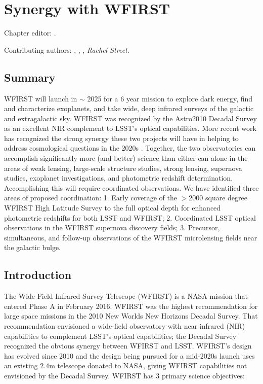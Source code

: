 \chapter[Synergy with WFIRST]{Synergy with WFIRST}
\def\chpname{wfirst}\label{chp:\chpname}

Chapter editor:
.

Contributing authors:
,
,
,
{\it Rachel Street}.

\section*{Summary}

WFIRST will launch in $\sim$ 2025 for a 6 year mission to explore dark energy, find and characterize exoplanets, and take wide, deep infrared surveys of the galactic and extragalactic sky.  WFIRST was recognized by the Astro2010 Decadal Survey as an excellent NIR complement to LSST's optical capabilities. More recent work has recognized the strong synergy these two projects will have in helping to address cosmological questions in the 2020s \citep{2015arXiv150107897J}. 
  Together, the two observatories can accomplish significantly more (and better) science than either can alone in the areas of weak lensing, large-scale structure studies, strong lensing, supernova studies, exoplanet investigations,  and photometric redshift determination. Accomplishing this will require coordinated observations.  We have identified three areas of proposed coordination: 1. Early coverage of the $>2000$ square degree WFIRST High Latitude Survey to the full optical depth for enhanced photometric redshifts for both LSST and WFIRST; 2. Coordinated LSST optical observations in the WFIRST supernova discovery fields; 3. Precursor, simultaneous, and follow-up observations of the WFIRST microlensing fields near the galactic bulge.



\section{Introduction}
\label{sec:wfirst:intro}


The Wide Field Infrared Survey Telescope (WFIRST) is a NASA mission that
entered Phase A in February 2016.  WFIRST was the highest recommendation
for large space missions in the 2010 New Worlds New Horizons Decadal
Survey.  That recommendation envisioned a wide-field observatory with
near infrared (NIR) capabilities to complement LSST's optical
capabilities; the Decadal Survey recognized the obvious synergy between
WFIRST and LSST.  WFIRST's design has evolved since 2010 and the design
being pursued for a mid-2020s launch uses an existing $2.4$m telescope
donated to NASA, giving WFIRST capabilities not envisioned by the
Decadal Survey.  WFIRST has 3 primary science objectives:

